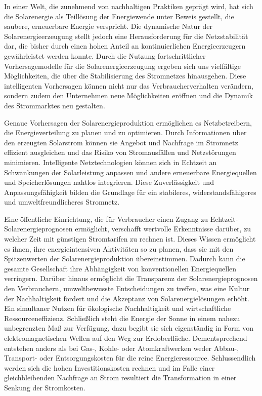 \documentclass[12pt, a4paper]{article}
\begin{document}
In einer Welt, die zunehmend von nachhaltigen Praktiken geprägt wird, hat sich die Solarenergie als Teillösung der Energiewende unter Beweis gestellt, die saubere, erneuerbare Energie verspricht. Die dynamische Natur der Solarenergieerzeugung stellt jedoch eine Herausforderung für die Netzstabilität dar, die bisher durch einen hohen Anteil an kontinuierlichen Energieerzeugern gewährleistet werden konnte. Durch die Nutzung fortschrittlicher Vorhersagemodelle für die Solarenergieerzeugung ergeben sich uns vielfältige Möglichkeiten, die über die Stabilisierung des Stromnetzes hinausgehen. Diese intelligenten Vorhersagen können nicht nur das Verbraucherverhalten verändern, sondern zudem den Unternehmen neue Möglichkeiten eröffnen und die Dynamik des Strommarktes neu gestalten.

Genaue Vorhersagen der Solarenergieproduktion ermöglichen es Netzbetreibern, die Energieverteilung zu planen und zu optimieren. Durch Informationen über den erzeugten Solarstrom können sie Angebot und Nachfrage im Stromnetz effizient ausgleichen und das Risiko von Stromausfällen und Netzstörungen minimieren. Intelligente Netztechnologien können sich in Echtzeit an Schwankungen der Solarleistung anpassen und andere erneuerbare Energiequellen und Speicherlösungen nahtlos integrieren. Diese Zuverlässigkeit und Anpassungsfähigkeit bilden die Grundlage für ein stabileres, widerstandsfähigeres und umweltfreundlicheres Stromnetz.

Eine öffentliche Einrichtung, die für Verbraucher einen Zugang zu Echtzeit-Solarenergieprognosen ermöglicht, verschafft wertvolle Erkenntnisse darüber, zu welcher Zeit mit günstigen Stromtarifen zu rechnen ist. Dieses Wissen ermöglicht es ihnen, ihre energieintensiven Aktivitäten so zu planen, dass sie mit den Spitzenwerten der Solarenergieproduktion übereinstimmen. Dadurch kann die gesamte Gesellschaft ihre Abhängigkeit von konventionellen Energiequellen verringern. Darüber hinaus ermöglicht die Transparenz der Solarenergieprognosen den Verbrauchern, umweltbewusste Entscheidungen zu treffen, was eine Kultur der Nachhaltigkeit fördert und die Akzeptanz von Solarenergielösungen erhöht. Ein simultaner Nutzen für ökologische Nachhaltigkeit und wirtschaftliche Ressourceneffizienz. Schließlich steht die Energie der Sonne in einem nahezu unbegrenzten Maß zur Verfügung, dazu begibt sie sich eigenständig in Form von elektromagnetischen Wellen auf den Weg zur Erdoberfläche. Dementsprechend entstehen anders als bei Gas-, Kohle- oder Atomkraftwerken weder Abbau-, Transport- oder Entsorgungskosten für die reine Energieressource. Schlussendlich werden sich die hohen Investitionskosten rechnen und im Falle einer gleichbleibenden Nachfrage an Strom resultiert die Transformation in einer Senkung der Stromkosten.
\end{document}

